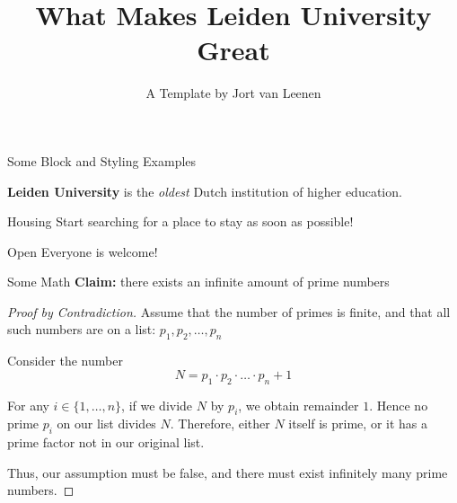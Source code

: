 \documentclass[aspectratio=169, 10pt]{beamer}
\title{What Makes Leiden University\\Great}
\author{A Template by Jort van Leenen}
\institute{Based on the Official PowerPoint}
\begin{document}
    \begin{frame}[plain]
        \titlepage
    \end{frame}

    \begin{frame}{Some Block and Styling Examples}
        \begin{definition}
            \textbf{Leiden University} is the \emph{oldest} Dutch institution of higher education.
        \end{definition}

        \begin{alertblock}{Housing}
            Start searching for a place to stay \alert{as soon as possible}!
        \end{alertblock}

        \begin{exampleblock}{Open}
            Everyone is welcome!
        \end{exampleblock}
    \end{frame}

    \begin{frame}{Some Math}
        \textbf{Claim:} there exists an infinite amount of prime numbers
        \begin{proof}[Proof by Contradiction]
            Assume that the number of primes is finite, and that all such numbers are on a list: \(p_1, p_2, \dots, p_n\)
            \smallskip

            Consider the number
            \[N = p_1 \cdot p_2 \cdot \ldots \cdot p_n + 1\]

            For any $i \in \{1, \dots, n\}$, if we divide $N$ by $p_i$, we obtain remainder $1$. Hence no prime $p_i$ on our list divides $N$. Therefore, either $N$ itself is prime, or it has a prime factor not in our original list.
            \smallskip

            Thus, our assumption must be false, and there must exist infinitely many prime numbers.
        \end{proof}
    \end{frame}
\end{document}
